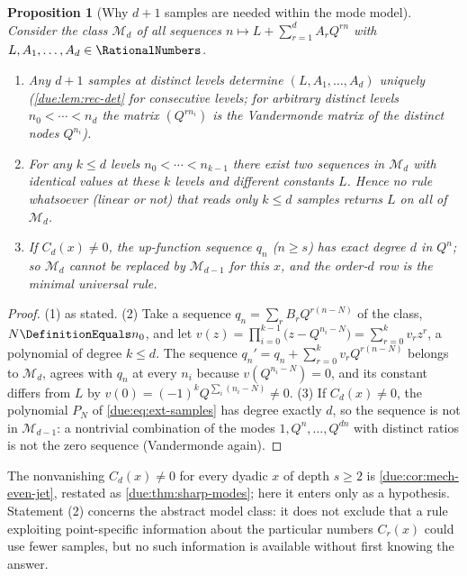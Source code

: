 \documentclass[11pt,oneside]{article}
\theoremstyle{plain}
\newtheorem{proposition}[theorem]{Proposition}
\theoremstyle{definition}
\theoremstyle{remark}
\newcommand{\Kk}{\RationalNumbers}                          %
\newcommand{\upn}[1]{\RvachevUp_{#1}}
\newcommand{\Qq}{Q}                                         %
\newcommand{\Cr}[2]{C_{#1}\!\left(#2\right)}                %
\newcommand{\qn}[1]{q_{#1}}                                 %
\begin{document}
\begin{proposition}[Why $d+1$ samples are needed within the mode model]
\label{due:prop:rec-minimal}
Consider the class $\mathcal M_{d}$ of all sequences
$n\mapsto L+\sum_{r=1}^{d}A_{r}\Qq^{rn}$ with $L,A_{1},\ldots,A_{d}\in\Kk$.
\begin{enumerate}
\item Any $d+1$ samples at distinct levels determine $(L,A_{1},\ldots,A_{d})$
 uniquely (\cref{due:lem:rec-det} for consecutive levels; for arbitrary
 distinct levels $n_{0}<\cdots<n_{d}$ the matrix $(\Qq^{rn_{i}})$ is the
 Vandermonde matrix of the distinct nodes $\Qq^{n_{i}}$).
\item For any $k\le d$ levels $n_{0}<\cdots<n_{k-1}$ there exist two sequences
 in $\mathcal M_{d}$ with identical values at these $k$ levels and different
 constants $L$.  Hence no rule whatsoever (linear or not) that reads only
 $k\le d$ samples returns $L$ on all of $\mathcal M_{d}$.
\item If $\Cr{d}{x}\neq0$, the up-function sequence $\qn{n}$ ($n\ge s$) has
 exact degree $d$ in $\Qq^{n}$; so $\mathcal M_{d}$ cannot be replaced by
 $\mathcal M_{d-1}$ for this $x$, and the order-$d$ row is the minimal
 universal rule.
\end{enumerate}
\end{proposition}

\begin{proof}
(1) as stated.  (2) Take a sequence $\qn{n}=\sum_{r}B_{r}\Qq^{r(n-N)}$ of the
class, $N\DefinitionEquals n_{0}$, and let
$v(z)=\prod_{i=0}^{k-1}\bigl(z-\Qq^{n_{i}-N}\bigr)=\sum_{r=0}^{k}v_{r}z^{r}$,
a polynomial of degree $k\le d$.  The sequence
$\qn{n}'=\qn{n}+\sum_{r=0}^{k}v_{r}\Qq^{r(n-N)}$ belongs to $\mathcal M_{d}$,
agrees with $\qn{n}$ at every $n_{i}$ because $v(\Qq^{n_{i}-N})=0$, and its
constant differs from $L$ by $v(0)=(-1)^{k}\Qq^{\sum_{i}(n_{i}-N)}\neq0$.
(3) If $\Cr{d}{x}\ne0$, the polynomial $P_{N}$ of \cref{due:eq:ext-samples}
has degree exactly $d$, so the sequence is not in $\mathcal M_{d-1}$: a
nontrivial combination of the modes $1,\Qq^{n},\ldots,\Qq^{dn}$ with distinct
ratios is not the zero sequence (Vandermonde again).
\end{proof}

The nonvanishing $\Cr{d}{x}\ne0$ for every dyadic $x$ of depth $s\ge2$ is
\cref{due:cor:mech-even-jet}, restated as \cref{due:thm:sharp-modes}; here it
enters only as a hypothesis.  Statement (2) concerns the abstract model class: it
does not exclude that a rule exploiting point-specific information about the
particular numbers $\Cr{r}{x}$ could use fewer samples, but no such
information is available without first knowing the answer.
\end{document}
